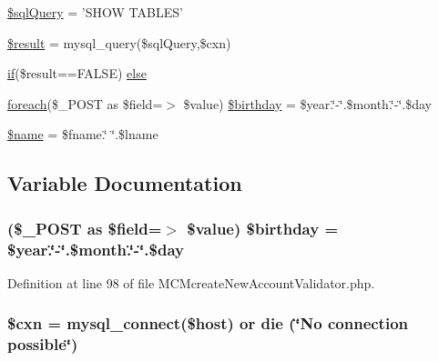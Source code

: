 \begin{DoxyCompactItemize}
\item 
\hyperlink{_m_c_mcreate_new_account_validator_8php_a08f961a26ebf8ad5411239bba701a67c}{\$sql\-Query} = 'S\-H\-O\-W T\-A\-B\-L\-E\-S'
\item 
\hyperlink{_m_c_mcreate_new_account_validator_8php_a112ef069ddc0454086e3d1e6d8d55d07}{\$result} = mysql\-\_\-query(\$sql\-Query,\$cxn)
\item 
\hyperlink{_m_c_mhome_page_8php_a8dec719c1645067d1065f7f064d4b967}{if}(\$result==F\-A\-L\-S\-E) \hyperlink{_m_c_mcreate_new_account_validator_8php_a6b5f81c8ab2d615e3528311678d7870f}{else}
\item 
\hyperlink{_m_c_mlogin_8php_a58d12ec81e33be9b80508ee874adb2c1}{foreach}(\$\-\_\-\-P\-O\-S\-T as \$field=$>$ \$value) \hyperlink{_m_c_mcreate_new_account_validator_8php_ab8d98de5aa650b9f437292caa496b146}{\$birthday} = \$year.\char`\"{}-\/\char`\"{}.\$month.\char`\"{}-\/\char`\"{}.\$day
\item 
\hyperlink{_m_c_mcreate_new_account_validator_8php_ab2fc40d43824ea3e1ce5d86dee0d763b}{\$name} = \$fname.\char`\"{} \char`\"{}.\$lname
\end{DoxyCompactItemize}


\subsection{Variable Documentation}
\hypertarget{_m_c_mcreate_new_account_validator_8php_ab8d98de5aa650b9f437292caa496b146}{
\subsubsection[{\$birthday}]{ (\$\-\_\-\-P\-O\-S\-T as \$field=$>$ \$value) \$birthday = \$year.\char`\"{}-\/\char`\"{}.\$month.\char`\"{}-\/\char`\"{}.\$day}}\label{_m_c_mcreate_new_account_validator_8php_ab8d98de5aa650b9f437292caa496b146}


Definition at line 98 of file M\-C\-Mcreate\-New\-Account\-Validator.\-php.

\hypertarget{_m_c_mcreate_new_account_validator_8php_afe14c5bdb9487c058ec831382f1fbacd}{
\subsubsection[{\$cxn}]{\setlength{\rightskip}{0pt plus 5cm}\$cxn = mysql\-\_\-connect(\$host) or die (\char`\"{}No connection possible\char`\"{})}}\label{_m_c_mcreate_new_account_validator_8php_afe14c5bdb9487c058ec831382f1fbacd}


